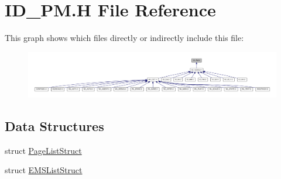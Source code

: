 \hypertarget{ID__PM_8H}{
\section{ID\_\-PM.H File Reference}
\label{ID__PM_8H}
}
This graph shows which files directly or indirectly include this file:
\nopagebreak
\begin{figure}[H]
\begin{center}
\leavevmode
\includegraphics[width=400pt]{ID__PM_8H__dep__incl}
\end{center}
\end{figure}
\subsection*{Data Structures}
\begin{DoxyCompactItemize}
\item 
struct \hyperlink{structPageListStruct}{PageListStruct}
\item 
struct \hyperlink{structEMSListStruct}{EMSListStruct}
\end{DoxyCompactItemize}
